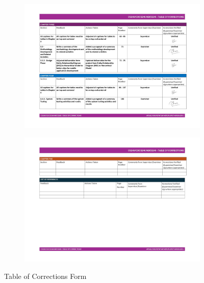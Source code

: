 \begin{figure}[h]
    \centering
    \begin{subfigure}[b]{0.9\textwidth}
        \centering
        \includegraphics[width=\textwidth]{appendices/forms/toc5.jpg}
        \label{fig:sub1}
    \end{subfigure}
    \hspace{0.03\textwidth}
    \begin{subfigure}[b]{0.9\textwidth}
        \centering
        \includegraphics[width=\textwidth]{appendices/forms/toc6.jpg}
        \label{fig:sub2}
    \end{subfigure}
    \caption{Table of Corrections Form}
    \label{fig:myfig92}
\end{figure}
\clearpage
